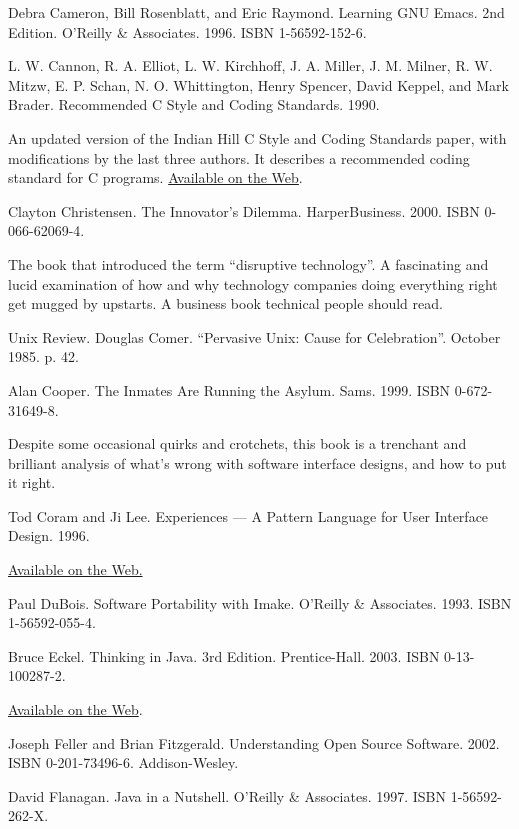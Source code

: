 \documentclass[12pt,oneside]{ctexbook}
\begin{document}
\begin{common-format}
\begin{thebibliography}{9}
 Debra Cameron, Bill Rosenblatt, and Eric Raymond. Learning GNU Emacs. 2nd Edition. O'Reilly \&{} Associates. 1996. ISBN 1-56592-152-6.

 L. W. Cannon, R. A. Elliot, L. W. Kirchhoff, J. A. Miller, J. M. Milner, R. W. Mitzw, E. P. Schan, N. O. Whittington, Henry Spencer, David Keppel, and Mark Brader. Recommended C Style and Coding Standards. 1990.

An updated version of the Indian Hill C Style and Coding Standards paper, with modifications by the last three authors. It describes a recommended coding standard for C programs. \href{http://www.apocalypse.org/pub/u/paul/docs/cstyle/cstyle.htm}{Available on the Web}.

 Clayton Christensen. The Innovator's Dilemma. HarperBusiness. 2000. ISBN 0-066-62069-4.

The book that introduced the term “disruptive technology”. A fascinating and lucid examination of how and why technology companies doing everything right get mugged by upstarts. A business book technical people should read.

 Unix Review. Douglas Comer. “Pervasive Unix: Cause for Celebration”. October 1985. p. 42.

 Alan Cooper. The Inmates Are Running the Asylum. Sams. 1999. ISBN 0-672-31649-8.

Despite some occasional quirks and crotchets, this book is a trenchant and brilliant analysis of what's wrong with software interface designs, and how to put it right.

 Tod Coram and Ji Lee. Experiences — A Pattern Language for User Interface Design. 1996.

\href{http://www.maplefish.com/todd/papers/Experiences.html}{Available on the Web.}

 Paul DuBois. Software Portability with Imake. O'Reilly \&{} Associates. 1993. ISBN 1-56592-055-4.

 Bruce Eckel. Thinking in Java. 3rd Edition. Prentice-Hall. 2003. ISBN 0-13-100287-2.

\href{http://www.mindview.net/Books/TIJ/}{Available on the Web}.

 Joseph Feller and Brian Fitzgerald. Understanding Open Source Software. 2002. ISBN 0-201-73496-6. Addison-Wesley.

 David Flanagan. Java in a Nutshell. O'Reilly \&{} Associates. 1997. ISBN 1-56592-262-X.


\end{thebibliography}
\end{common-format}
\end{document}
